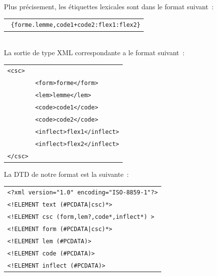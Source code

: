 Plus précisement, les étiquettes lexicales sont dans le format suivant~:\\
\begin{tabular}{c}
\texttt{
\{forme.lemme,code1+code2:flex1:flex2\}}
\end{tabular}\\
La sortie de type XML correspondante a le format suivant~:\\
\begin{tabular}{ll}
\texttt{<csc>}&\\
	&\texttt{<form>forme</form>}\\
	&\texttt{<lem>lemme</lem>}\\
	&\texttt{<code>code1</code>}\\
	&\texttt{<code>code2</code>}\\
	&\texttt{<inflect>flex1</inflect>}\\
	&\texttt{<inflect>flex2</inflect>}\\
\texttt{</csc>}&\\
\end{tabular}

La DTD de notre format est la suivante~:

\begin{tabular}{l}
\texttt{<?xml version="1.0" encoding="ISO-8859-1"?>}\\
\texttt{<!ELEMENT text (\#PCDATA|csc)*>}\\
\texttt{<!ELEMENT csc (form,lem?,code*,inflect*) >}\\
\texttt{<!ELEMENT form (\#PCDATA|csc)*>}\\
\texttt{<!ELEMENT lem (\#PCDATA)>}\\
\texttt{<!ELEMENT code (\#PCDATA)>}\\
\texttt{<!ELEMENT inflect (\#PCDATA)>}\\
\end{tabular}



